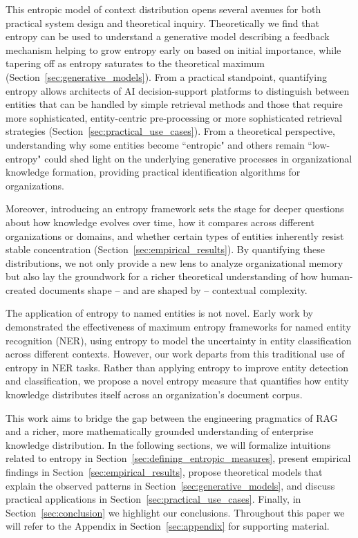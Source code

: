 \documentclass[11pt,a4paper]{article}
\begin{document}
This entropic model of context distribution opens several avenues for both practical system design and theoretical inquiry. Theoretically we find that entropy can be used to understand a generative model describing a feedback mechanism helping to grow entropy early on based on initial importance, while tapering off as entropy saturates to the theoretical maximum (Section~\ref{sec:generative_models}). From a practical standpoint, quantifying entropy allows architects of AI decision-support platforms to distinguish between entities that can be handled by simple retrieval methods and those that require more sophisticated, entity-centric pre-processing or more sophisticated retrieval strategies (Section~\ref{sec:practical_use_cases}). From a theoretical perspective, understanding why some entities become ``entropic" and others remain ``low-entropy" could shed light on the underlying generative processes in organizational knowledge formation, providing practical identification algorithms for organizations.

Moreover, introducing an entropy framework sets the stage for deeper questions about how knowledge evolves over time, how it compares across different organizations or domains, and whether certain types of entities inherently resist stable concentration (Section~\ref{sec:empirical_results}). By quantifying these distributions, we not only provide a new lens to analyze organizational memory but also lay the groundwork for a richer theoretical understanding of how human-created documents shape -- and are shaped by -- contextual complexity.

The application of entropy to named entities is not novel. Early work by \cite{chieu2003named} demonstrated the effectiveness of maximum entropy frameworks for named entity recognition (NER), using entropy to model the uncertainty in entity classification across different contexts. However, our work departs from this traditional use of entropy in NER tasks. Rather than applying entropy to improve entity detection and classification, we propose a novel entropy measure that quantifies how entity knowledge distributes itself across an organization's document corpus.

This work aims to bridge the gap between the engineering pragmatics of RAG and a richer, more mathematically grounded understanding of enterprise knowledge distribution. In the following sections, we will formalize intuitions related to entropy in Section~\ref{sec:defining_entropic_measures}, present empirical findings in Section~\ref{sec:empirical_results}, propose theoretical models that explain the observed patterns in Section~\ref{sec:generative_models}, and discuss practical applications in Section~\ref{sec:practical_use_cases}. Finally, in Section~\ref{sec:conclusion} we highlight our conclusions. Throughout this paper we will refer to the Appendix in Section~\ref{sec:appendix} for supporting material.
\end{document}
